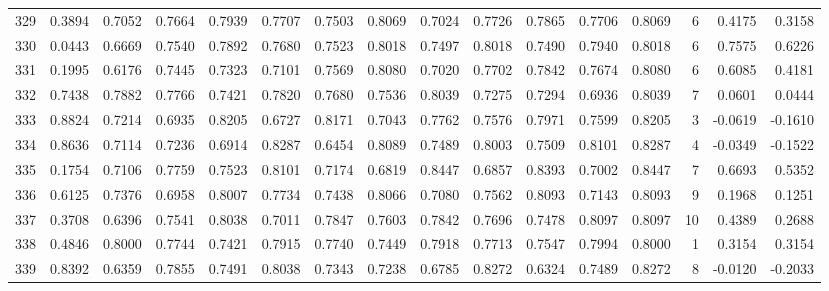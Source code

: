 \begin{tabular}{lrrrrrrrrrrrrrrr}
329 &      0.3894 &  0.7052 &  0.7664 &  0.7939 &  0.7707 &  0.7503 &  0.8069 &  0.7024 &  0.7726 &  0.7865 &   0.7706 &     0.8069 &      6 &                    0.4175 &                     0.3158 \\
330 &      0.0443 &  0.6669 &  0.7540 &  0.7892 &  0.7680 &  0.7523 &  0.8018 &  0.7497 &  0.8018 &  0.7490 &   0.7940 &     0.8018 &      6 &                    0.7575 &                     0.6226 \\
331 &      0.1995 &  0.6176 &  0.7445 &  0.7323 &  0.7101 &  0.7569 &  0.8080 &  0.7020 &  0.7702 &  0.7842 &   0.7674 &     0.8080 &      6 &                    0.6085 &                     0.4181 \\
332 &      0.7438 &  0.7882 &  0.7766 &  0.7421 &  0.7820 &  0.7680 &  0.7536 &  0.8039 &  0.7275 &  0.7294 &   0.6936 &     0.8039 &      7 &                    0.0601 &                     0.0444 \\
333 &      0.8824 &  0.7214 &  0.6935 &  0.8205 &  0.6727 &  0.8171 &  0.7043 &  0.7762 &  0.7576 &  0.7971 &   0.7599 &     0.8205 &      3 &                   -0.0619 &                    -0.1610 \\
334 &      0.8636 &  0.7114 &  0.7236 &  0.6914 &  0.8287 &  0.6454 &  0.8089 &  0.7489 &  0.8003 &  0.7509 &   0.8101 &     0.8287 &      4 &                   -0.0349 &                    -0.1522 \\
335 &      0.1754 &  0.7106 &  0.7759 &  0.7523 &  0.8101 &  0.7174 &  0.6819 &  0.8447 &  0.6857 &  0.8393 &   0.7002 &     0.8447 &      7 &                    0.6693 &                     0.5352 \\
336 &      0.6125 &  0.7376 &  0.6958 &  0.8007 &  0.7734 &  0.7438 &  0.8066 &  0.7080 &  0.7562 &  0.8093 &   0.7143 &     0.8093 &      9 &                    0.1968 &                     0.1251 \\
337 &      0.3708 &  0.6396 &  0.7541 &  0.8038 &  0.7011 &  0.7847 &  0.7603 &  0.7842 &  0.7696 &  0.7478 &   0.8097 &     0.8097 &     10 &                    0.4389 &                     0.2688 \\
338 &      0.4846 &  0.8000 &  0.7744 &  0.7421 &  0.7915 &  0.7740 &  0.7449 &  0.7918 &  0.7713 &  0.7547 &   0.7994 &     0.8000 &      1 &                    0.3154 &                     0.3154 \\
339 &      0.8392 &  0.6359 &  0.7855 &  0.7491 &  0.8038 &  0.7343 &  0.7238 &  0.6785 &  0.8272 &  0.6324 &   0.7489 &     0.8272 &      8 &                   -0.0120 &                    -0.2033 \\

\end{tabular}
